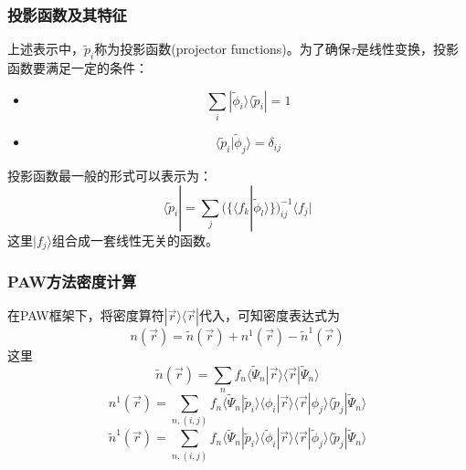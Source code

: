 \documentclass[cjk,slidestop,compress,mathserif,blue]{beamer}
\begin{document}
\frame
{
\frametitle{投影函数及其特征}
上述表示中，$\tilde p_i$称为投影函数\textrm{(projector functions)}。为了确保$\tau$是线性变换，投影函数要满足一定的条件：
\begin{itemize}
	\item $$\sum_i|\tilde\phi_i\rangle\langle\tilde p_i|=1$$
	\item $$\langle\tilde p_i|\tilde\phi_j\rangle=\delta_{ij}$$
\end{itemize}
投影函数最一般的形式可以表示为：
$$\langle\tilde p_i|=\sum_j(\{\langle f_k|\tilde\phi_l\rangle\})_{ij}^{-1}\langle f_j|$$
这里$|f_j\rangle$组合成一套线性无关的函数。
}



\frame
{
\frametitle{\textrm{PAW}方法密度计算}
在\textrm{PAW}框架下，将密度算符$|\vec r\rangle\langle\vec r|$代入，可知密度表达式为
$$n(\vec r)=\tilde n(\vec r)+n^1(\vec r)-\tilde n^1(\vec r)$$
这里
$$\tilde n(\vec r)=\sum_nf_n\langle\tilde\Psi_n|\vec r\rangle\langle\vec r|\tilde\Psi_n\rangle$$ 
$$n^1(\vec r)=\sum_{n,(i,j)}f_n\langle\tilde\Psi_n|\tilde p_i\rangle\langle\phi_i|\vec r\rangle\langle\vec r|\phi_j\rangle\langle\tilde p_j|\tilde\Psi_n\rangle$$
$$\tilde n^1(\vec r)=\sum_{n,(i,j)}f_n\langle\tilde\Psi_n|\tilde p_i\rangle\langle\tilde\phi_i|\vec r\rangle\langle\vec r|\tilde\phi_j\rangle\langle\tilde p_j|\tilde\Psi_n\rangle$$
}
\end{document}
